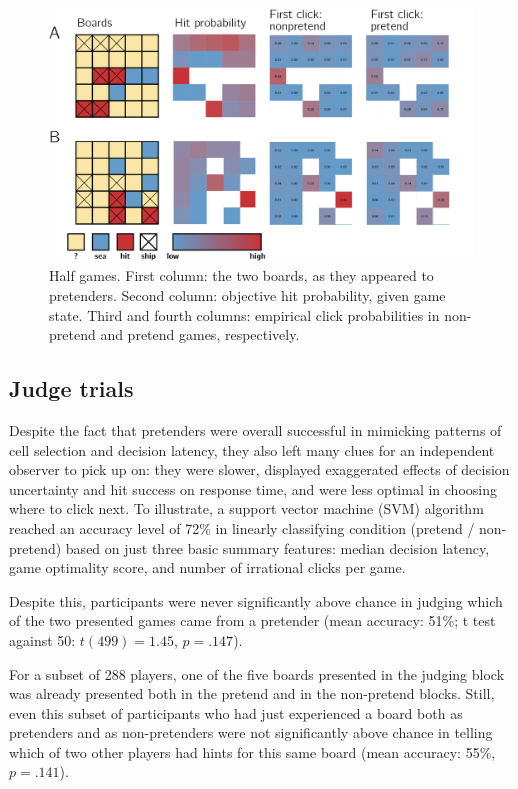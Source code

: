 \documentclass[10pt, letterpaper]{article}
\newenvironment{CodeChunk}{}{}
\begin{document}
\begin{CodeChunk}
\begin{figure}[tb]
\includegraphics[width=1\linewidth]{../figures/Half_games} \caption[Half games]{Half games. First column: the two boards, as they appeared to pretenders. Second column: objective hit probability, given game state. Third and fourth columns: empirical click probabilities in non-pretend and pretend games, respectively.}\label{fig:half-games}
\end{figure}
\end{CodeChunk}

\hypertarget{judge-trials-1}{%
\subsection{Judge trials}\label{judge-trials-1}}

Despite the fact that pretenders were overall successful in mimicking
patterns of cell selection and decision latency, they also left many
clues for an independent observer to pick up on: they were slower,
displayed exaggerated effects of decision uncertainty and hit success on
response time, and were less optimal in choosing where to click next. To
illustrate, a support vector machine (SVM) algorithm reached an accuracy
level of 72\% in linearly classifying condition (pretend / non-pretend)
based on just three basic summary features: median decision latency,
game optimality score, and number of irrational clicks per game.

Despite this, participants were never significantly above chance in
judging which of the two presented games came from a pretender (mean
accuracy: 51\%; t test against 50: \(t(499) = 1.45\), \(p = .147\)).

For a subset of 288 players, one of the five boards presented in the
judging block was already presented both in the pretend and in the
non-pretend blocks. Still, even this subset of participants who had just
experienced a board both as pretenders and as non-pretenders were not
significantly above chance in telling which of two other players had
hints for this same board (mean accuracy: 55\%, \(p=.141\)).
\end{document}
